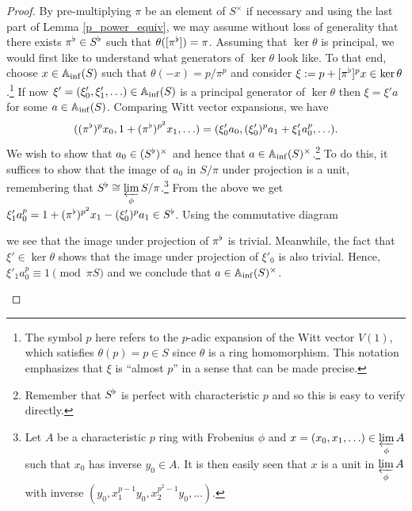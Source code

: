 \documentclass[11pt]{article}
\begin{document}
\begin{proof}
By pre-multiplying $\pi$ be an element of $S^{\times}$ if necessary and using the last part of Lemma \ref{p_power_equiv}, we may assume without loss of generality that there exists $\pi^{\flat}\in S^{\flat}$ such that $\theta([\pi^{\flat}])=\pi$. Assuming that $\ker\theta$ is principal, we would first like to understand what generators of $\ker\theta$ look like. To that end, choose $x\in\mathbb{A}_{\inf}(S)$ such that $\theta(-x)=p/\pi^p$ and consider $\xi:=p+[\pi^{\flat}]^px\in\ker\theta$.\footnote{The symbol $p$ here refers to the $p$-adic expansion of the Witt vector $V(1)$, which satisfies $\theta(p)=p\in S$ since $\theta$ is a ring homomorphism. This notation emphasizes that $\xi$ is ``almost $p$'' in a sense that can be made precise.} If now $\xi'=(\xi'_0,\xi'_1,\ldots)\in\mathbb{A}_{\inf}(S)$ is a principal generator of $\ker\theta$ then $\xi=\xi'a$ for some $a\in\mathbb{A}_{\inf}(S)$. Comparing Witt vector expansions, we have 
\begin{equation*}
((\pi^{\flat})^px_0,1+(\pi^{\flat})^{p^2}x_1,\ldots)=(\xi'_0a_0,(\xi'_0)^pa_1+\xi'_1a_0^p,\ldots).
\end{equation*}
We wish to show that $a_0\in(S^{\flat})^{\times}$ and hence that $a\in\mathbb{A}_{\inf}(S)^{\times}$.\footnote{Remember that $S^{\flat}$ is perfect with characteristic $p$ and so this is easy to verify directly.} To do this, it suffices to show that the image of $a_0$ in $S/\pi$ under projection is a unit, remembering that $S^{\flat}\cong\displaystyle\varprojlim_{\phi}S/\pi$.\footnote{Let $A$ be a characteristic $p$ ring with Frobenius $\phi$ and $x=(x_0,x_1,\ldots)\in\displaystyle\varprojlim_{\phi}A$ such that $x_0$ has inverse $y_0\in A$. It is then easily seen that $x$ is a unit in $\displaystyle\varprojlim_{\phi}A$ with inverse $(y_0,x_1^{p-1}y_0,x_2^{p^2-1}y_0,\ldots)$.} From the above we get $\xi'_1a_0^p=1+(\pi^{\flat})^{p^2}x_1-(\xi'_0)^pa_1\in S^{\flat}$. Using the commutative diagram
\begin{center}
\end{center}
we see that the image under projection of $\pi^{\flat}$ is trivial. Meanwhile, the fact that $\xi'\in\ker\theta$ shows that the image under projection of $\xi'_0$ is also trivial. Hence, $\xi'_1a_0^p\equiv1\pmod{\pi S}$ and we conclude that $a\in\mathbb{A}_{\inf}(S)^{\times}$.
\begin{enum}{\alph}

\end{enum}
\end{proof}
\end{document}
